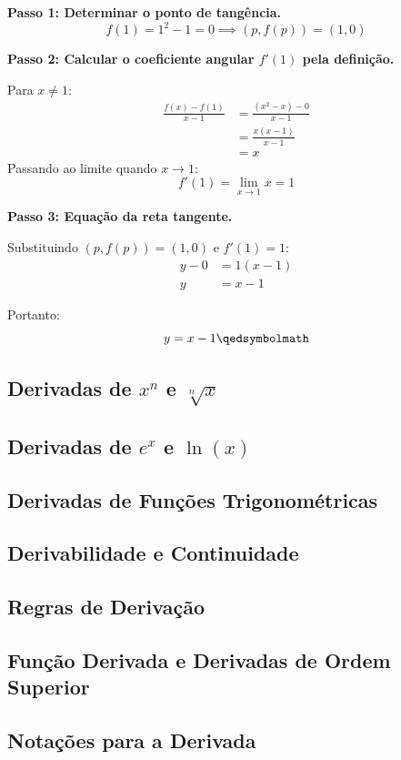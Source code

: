 \begin{enumerate}[label=\alph*)]
    \textbf{Passo 1: Determinar o ponto de tangência.}
    \[
    f(1) = 1^2 - 1 = 0 \implies (p, f(p)) = (1, 0)
    \]

    \textbf{Passo 2: Calcular o coeficiente angular $f'(1)$ pela definição.}

    Para $x \neq 1$:
    \begin{align*}
        \frac{f(x) - f(1)}{x - 1} &= \frac{(x^2 - x) - 0}{x - 1} \\[0.25cm]
        &= \frac{x(x - 1)}{x - 1} \\[0.25cm]
        &= x
    \end{align*}
    Passando ao limite quando $x \to 1$:
    \[
    f'(1) = \lim_{x \to 1} x = 1
    \]

    \textbf{Passo 3: Equação da reta tangente.}

    Substituindo $(p, f(p)) = (1, 0)$ e $f'(1) = 1$:
    \begin{align*}
        y - 0 &= 1(x - 1) \\[0.25cm]
        y &= x - 1
    \end{align*}

    Portanto:
    \[
    y = x - 1 \qedsymbolmath
    \]
\end{enumerate}

\subsection{Derivadas de $x^n$ e $\sqrt[n]{x}$}
\subsection{Derivadas de $e^x$ e $\ln(x)$}
\subsection{Derivadas de Funções Trigonométricas}
\subsection{Derivabilidade e Continuidade}
\subsection{Regras de Derivação}
\subsection{Função Derivada e Derivadas de Ordem Superior}
\subsection{Notações para a Derivada}
